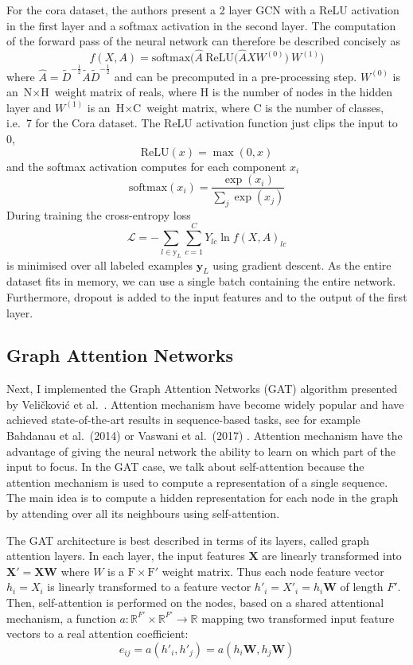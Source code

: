 \documentclass[12pt]{article}
\theoremstyle{definition}
\begin{document}
For the cora dataset, the authors present a 2 layer GCN with a ReLU activation in the first layer and a softmax activation in the second layer. The computation of the forward pass of the neural network can therefore be described concisely as
\[
f(X,A) = \textrm{softmax}\big(\hat{A}\ \textrm{ReLU}\big( \hat{A} X W^{(0)} \big)\ W^{(1)} \big)
\]
where $\hat{A} = \tilde{D}^{-\frac{1}{2}} \tilde{A} \tilde{D}^{-\frac{1}{2}}$ and can be precomputed in a pre-processing step. $W^{(0)}$ is an $\textrm{N} \times \textrm{H}$ weight matrix of reals, where H is the number of nodes in the hidden layer and $W^{(1)}$ is an $\textrm{H} \times \textrm{C}$ weight matrix, where C is the number of classes, i.e.\ 7  for the Cora dataset. The ReLU activation function just clips the input to 0,
\[
\textrm{ReLU}(x) = \max(0, x)
\]
and the softmax activation computes for each component $x_i$
\[
\textrm{softmax}(x_i) = \frac{\exp(x_i)}{\sum_j \exp(x_j)}
\]
During training the cross-entropy loss 
\[
\mathcal{L} = - \sum_{l \in \textrm{y}_L} \sum_{c=1}^{C} Y_{lc} \ln f(X,A)_{lc}
\]
is minimised over all labeled examples $\textbf{y}_L$ using gradient descent. As the entire dataset fits in memory, we can use a single batch containing the entire network. Furthermore, dropout \cite{srivastava2014dropout} is added to the input features and to the output of the first layer.

\subsection{Graph Attention Networks}
Next, I implemented the Graph Attention Networks (GAT) algorithm presented by Veli{\v{c}}kovi{\'{c}} et al.\ \cite{velickovic2018graph}. Attention mechanism have become widely popular and have achieved state-of-the-art results in sequence-based tasks, see for example Bahdanau et al.\ (2014) \cite{bahdanau2014neural} or Vaswani et al.\ (2017) \cite{vaswani2017attention}. Attention mechanism have the advantage of giving the neural network the ability to learn on which part of the input to focus. In the GAT case, we talk about self-attention because the attention mechanism is used to compute a representation of a single sequence. The main idea is to compute a hidden representation for each node in the graph by attending over all its neighbours using self-attention.

\bigskip

The GAT architecture is best described in terms of its layers, called graph attention layers. In each layer, the input features $\textbf{X}$ are linearly transformed into $\textbf{X}' = \textbf{X}\textbf{W}$ where $W$ is a $\textrm{F} \times \textrm{F}'$ weight matrix. Thus each node feature vector $h_i = X_i$ is linearly transformed to a feature vector $h'_i = X'_i = h_i \textbf{W}$ of length $F'$. Then, self-attention is performed on the nodes, based on a shared attentional mechanism, a function $a: \mathbb{R}^{F'} \times \mathbb{R}^{F'} \to \mathbb{R}$ mapping two transformed input feature vectors to a real attention coefficient:
\[
e_{ij} = a(h'_i, h'_j) = a(h_i \textbf{W}, h_j \textbf{W})
\]
\end{document}
